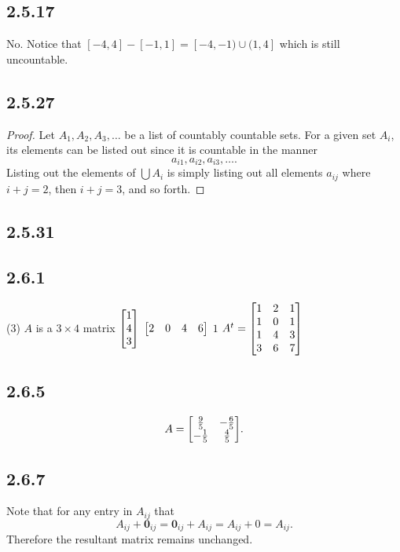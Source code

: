 \documentclass[12pt,titlepage]{extarticle}
\begin{document}
\subsection*{2.5.17}
No. Notice that $[-4, 4] - [-1, 1] = [-4, -1) \cup (1, 4]$ which is still uncountable.

\subsection*{2.5.27}
\begin{proof}
    Let $A_1, A_2, A_3, \ldots$ be a list of countably countable sets. For a given set $A_i$, its elements can be listed out since it is countable in the manner
    \[
        a_{i1}, a_{i 2}, a_{i 3}, \ldots
    .\]
    Listing out the elements of $\bigcup A_i$ is simply listing out all elements $a_{ij}$ where $i + j = 2$, then $i + j = 3$, and so forth.
\end{proof}

\subsection*{2.5.31} %

\subsection*{2.6.1}
\begin{tasks}(3)
    \task $A$ is a $3\times 4$ matrix
    \task $\mqty[1 \\ 4 \\ 3]$
    \task $\mqty[2 & 0 & 4 & 6]$
    \task $1$
    \task $A^t = \mqty[
    1 & 2 & 1 \\
    1 & 0 & 1 \\
    1 & 4 & 3 \\
    3 & 6 & 7 \\
    ]$
\end{tasks}

\subsection*{2.6.5}
\[
    A = \mqty[
    \frac{9}{5} & -\frac{6}{5} \\
    -\frac{1}{5} & \frac{4}{5}
    ]
.\]

\subsection*{2.6.7}
Note that for any entry in $A_{ij}$ that
\[
    A_{ij} + \mathbf{0}_{ij} = \mathbf{0}_{ij} + A_{ij} = A_{ij} + 0 = A_{ij}
.\]
Therefore the resultant matrix remains unchanged.
\end{document}
